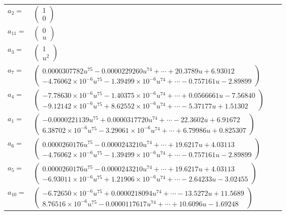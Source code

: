 \documentclass[1p]{elsarticle_modified}
\theoremstyle{definition}
\begin{document}
\begin{tabular}{m{7pt} m{180pt} m{7pt} m{180pt} }
\flushright $a_{2}=$&$\begin{pmatrix}1\\0\end{pmatrix}$ \\
\flushright $a_{11}=$&$\begin{pmatrix}0\\u\end{pmatrix}$ \\
\flushright $a_{3}=$&$\begin{pmatrix}1\\u^2\end{pmatrix}$ \\
\flushright $a_{7}=$&$\begin{pmatrix}0.0000307782 u^{75}-0.0000229260 u^{74}+\cdots+20.3789 u+6.93012\\-4.76062\times10^{-6} u^{75}-1.39499\times10^{-6} u^{74}+\cdots-0.757161 u-2.89899\end{pmatrix}$ \\
\flushright $a_{4}=$&$\begin{pmatrix}-7.78630\times10^{-6} u^{75}-1.40375\times10^{-6} u^{74}+\cdots+0.0566661 u-7.56840\\-9.12142\times10^{-6} u^{75}+8.62552\times10^{-6} u^{74}+\cdots-5.37177 u+1.51302\end{pmatrix}$ \\
\flushright $a_{1}=$&$\begin{pmatrix}-0.0000221139 u^{75}+0.0000317720 u^{74}+\cdots-22.3602 u+6.91672\\6.38702\times10^{-6} u^{75}-3.29061\times10^{-6} u^{74}+\cdots+6.79986 u+0.825307\end{pmatrix}$ \\
\flushright $a_{6}=$&$\begin{pmatrix}0.0000260176 u^{75}-0.0000243210 u^{74}+\cdots+19.6217 u+4.03113\\-4.76062\times10^{-6} u^{75}-1.39499\times10^{-6} u^{74}+\cdots-0.757161 u-2.89899\end{pmatrix}$ \\
\flushright $a_{5}=$&$\begin{pmatrix}0.0000260176 u^{75}-0.0000243210 u^{74}+\cdots+19.6217 u+4.03113\\-6.93011\times10^{-6} u^{75}+1.21906\times10^{-6} u^{74}+\cdots-2.64233 u-3.02455\end{pmatrix}$ \\
\flushright $a_{10}=$&$\begin{pmatrix}-6.72650\times10^{-6} u^{75}+0.0000218094 u^{74}+\cdots-13.5272 u+11.5689\\8.76516\times10^{-6} u^{75}-0.0000117617 u^{74}+\cdots+10.6096 u-1.69248\end{pmatrix}$ \\

\end{tabular}
\end{document}
